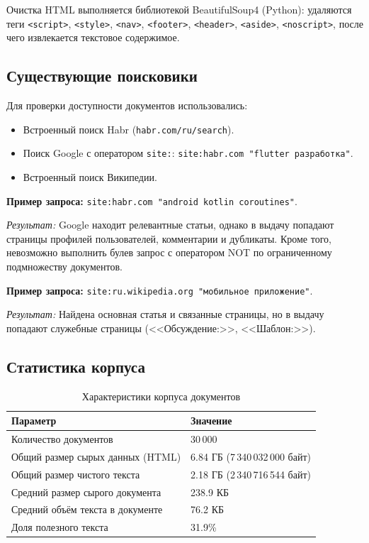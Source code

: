 \documentclass[12pt,a4paper]{article}
\begin{document}
Очистка HTML выполняется библиотекой BeautifulSoup4 (Python): удаляются теги \texttt{<script>}, \texttt{<style>}, \texttt{<nav>}, \texttt{<footer>}, \texttt{<header>}, \texttt{<aside>}, \texttt{<noscript>}, после чего извлекается текстовое содержимое.

\subsection{Существующие поисковики}

Для проверки доступности документов использовались:
\begin{itemize}
    \item Встроенный поиск Habr (\texttt{habr.com/ru/search}).
    \item Поиск Google с оператором \texttt{site:}: \texttt{site:habr.com "flutter разработка"}.
    \item Встроенный поиск Википедии.
\end{itemize}

\textbf{Пример запроса:} \texttt{site:habr.com "android kotlin coroutines"}.

\textit{Результат:} Google находит релевантные статьи, однако в выдачу попадают страницы профилей пользователей, комментарии и дубликаты. Кроме того, невозможно выполнить булев запрос с оператором NOT по ограниченному подмножеству документов.

\textbf{Пример запроса:} \texttt{site:ru.wikipedia.org "мобильное приложение"}.

\textit{Результат:} Найдена основная статья и связанные страницы, но в выдачу попадают служебные страницы (<<Обсуждение:>>, <<Шаблон:>>).

\subsection{Статистика корпуса}

\begin{table}[h]
\centering
\begin{tabular}{@{}ll@{}}
\toprule
\textbf{Параметр} & \textbf{Значение} \\ \midrule
Количество документов & 30\,000 \\
Общий размер сырых данных (HTML) & 6.84 ГБ (7\,340\,032\,000 байт) \\
Общий размер чистого текста & 2.18 ГБ (2\,340\,716\,544 байт) \\
Средний размер сырого документа & 238.9 КБ \\
Средний объём текста в документе & 76.2 КБ \\
Доля полезного текста & 31.9\% \\ \bottomrule
\end{tabular}
\caption{Характеристики корпуса документов}
\end{table}
\end{document}
